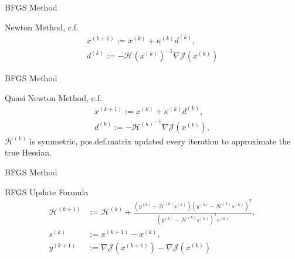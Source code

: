 \begin{frame}{BFGS Method}
    \begin{block}{Newton Method, c.f.~\cite{Nocedal2006}}
        \vspace*{-13pt}
        \begin{align*}
            x^{(k + 1)} := x^{(k)} + \kappa^{(k)} d^{(k)}, \\
            d^{(k)} := - {\mathcal{H}(x^{(k)})}^{-1} \nabla \mathcal{J}(x^{(k)})
        \end{align*}
    \end{block}
\end{frame}

\begin{frame}{BFGS Method}
    \begin{block}{Quasi Newton Method, c.f.~\cite{Kelley1999, Nocedal2006}}
        \vspace*{-13pt}
        \begin{align*}
            x^{(k + 1)} := x^{(k)} + \kappa^{(k)} d^{(k)}, \\
            d^{(k)} := - {\mathcal{H}^{(k)}}^{-1} \nabla \mathcal{J}(x^{(k)}),
        \end{align*}
        $\mathcal{H}^{(k)}$ is symmetric, pos.\@ def.\@ matrix updated every iteration to approximate the true Hessian.
    \end{block}
\end{frame}

\begin{frame}{BFGS Method}
    \begin{block}{BFGS Update Formula}
        \vspace*{-13pt}
        \begin{align*}
            \mathcal{H}^{(k + 1)} &:= \mathcal{H}^{(k)} + \frac{(y^{(k)} - \mathcal{H}^{(k)} s^{(k)}){(y^{(k)} - \mathcal{H}^{(k)} s^{(k)})}^T}{{(y^{(k)} - \mathcal{H}^{(k)} s^{(k)})}^T s^{(k)}}, \\
            s^{(k)} &:= x^{(k + 1)} - x^{(k)}, \\
            y^{(k + 1)} &:= \nabla \mathcal{J}(x^{(k + 1)}) - \nabla \mathcal{J}(x^{(k)})
        \end{align*}
    \end{block}
\end{frame}